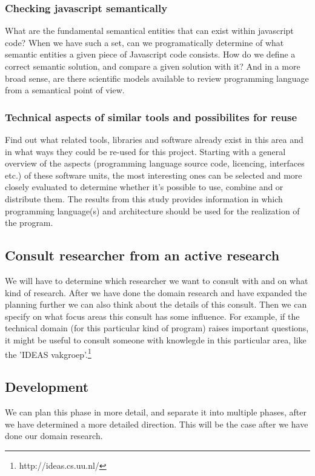 \documentclass{article}
\begin{document}
\subsubsection{Checking javascript semantically}
What are the fundamental semantical entities that can exist within javascript code? When we have such a set, can we programatically determine of what semantic entities a given piece of Javascript code consists. How do we define a correct semantic solution, and compare a given solution with it? And in a more broad sense, are there scientific models available to review programming language from a semantical point of view.
\subsubsection{Technical aspects of similar tools and possibilites for reuse}
Find out what related tools, libraries and software already exist in this area and in what ways they could be re-used for this project. Starting with a general overview of the aspects (programming language source code, licencing, interfaces etc.) of these software units, the most interesting ones can be selected and more closely evaluated to determine whether it's possible to use, combine and or distribute them. The results from this study provides information in which programming language(s) and architecture should be used for the realization of the program.

\subsection{Consult researcher from an active research}
We will have to determine which researcher we want to consult with and on what kind of research. After we have done the domain research and have expanded the planning further we can also think about the details of this consult. Then we can specify on what focus areas this consult has some influence. For example, if the technical domain (for this particular kind of program) raises important questions, it might be useful to consult someone with knowlegde in this particular area, like the 'IDEAS vakgroep'.\footnote{http://ideas.cs.uu.nl/}\\

\subsection{Development}
We can plan this phase in more detail, and separate it into multiple phases, after we have determined a more detailed direction. This will be the case after we have done our domain research.
\end{document}
